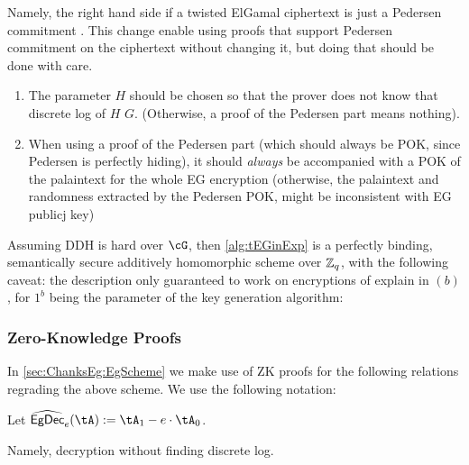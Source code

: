 Namely, the right hand side if a twisted ElGamal ciphertext is just a  Pedersen  commitment \cite{Pedersen91}. This change enable  using proofs that  support  Pedersen commitment on the ciphertext without changing it, but doing that  should be done with care.
\begin{enumerate}
	\item The parameter $H$ should be chosen so that the prover does not know that discrete log of $H$ \wrt $G$. (Otherwise, a proof of the Pedersen part means nothing).
	
	\item When using a proof of  the Pedersen part (which should always be POK, since Pedersen is perfectly hiding), it should \emph{always} be accompanied with a POK of the palaintext for the whole EG encryption (otherwise, the palaintext and randomness  extracted by the  Pedersen POK, might be  inconsistent with  EG publicj key)  
\end{enumerate}

\begin{theorem}\label{thm:tEGinExp}
	Assuming DDH is hard over $\cG$, then \cref{alg:tEGinExp} is  a perfectly binding,  semantically secure additively homomorphic scheme over ${\mathbb Z}_q$, with the following caveat:  the description only guaranteed to work on encryptions of explain in $(b)$,   for $1^b$ being the parameter  of the key generation algorithm:
\end{theorem}



\subsubsection{Zero-Knowledge Proofs}\label{sec:ChanksEg:Eg:ZK}


In \cref{sec:ChanksEg:EgScheme} we make use of ZK proofs for the following relations regrading the above scheme.   We use the following notation:
\begin{notation}
Let   $\wEgDec_e (\tA) \eqdef \tA_1- e\cdot \tA_0$.  
\end{notation}
Namely, decryption without finding discrete log.  


